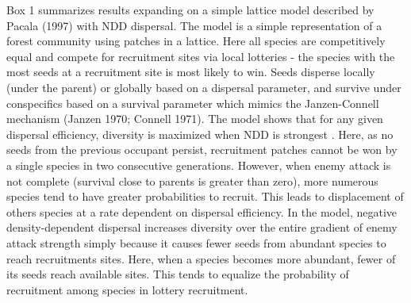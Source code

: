 \documentclass[b5paper,justified]{tufte-book} %
\begin{document}
\begin{fullwidth}
\end{fullwidth} Box 1 summarizes results expanding on a simple lattice model described by Pacala (1997) with NDD dispersal. The model is a simple representation of a forest community using patches in a lattice. Here all species are competitively equal and compete for recruitment sites via local lotteries - the species with the most seeds at a recruitment site is most likely to win. Seeds disperse locally (under the parent) or globally based on a dispersal parameter, and survive under conspecifics based on a survival parameter which mimics the Janzen-Connell mechanism (Janzen 1970; Connell 1971). The model shows that for any given dispersal efficiency, diversity is maximized when NDD is strongest \citep{Bagchi2010}. Here, as no seeds from the previous occupant persist, recruitment patches cannot be won by a single species in two consecutive generations. However, when enemy attack is not complete (survival close to parents is greater than zero), more numerous species tend to have greater probabilities to recruit. This leads to displacement of others species at a rate dependent on dispersal efficiency. In the model, negative density-dependent dispersal increases diversity over the entire gradient of enemy attack strength simply because it causes fewer seeds from abundant species to reach recruitments sites. Here, when a species becomes more abundant, fewer of its seeds reach available sites. This tends to equalize the probability of recruitment among species in lottery recruitment.\begin{fullwidth}
 

\end{fullwidth}
\end{document}
